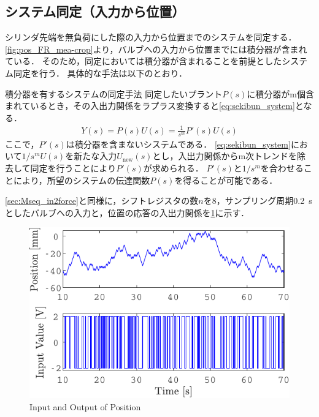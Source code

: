 \subsection{システム同定（入力から位置）}
シリンダ先端を無負荷にした際の入力から位置までのシステムを同定する．
\figname\ref{fig:pos_FR_mea-crop}より，バルブへの入力から位置までには積分器が含まれている．
そのため，同定においては積分器が含まれることを前提としたシステム同定\cite{竹下侑2014積分器を有するシステムの同定について}を行う．
具体的な手法は以下のとおり．
\begin{itembox}[l]{積分器を有するシステムの同定手法}
    同定したいプラント$P(s)$に積分器がm個含まれているとき，その入出力関係をラプラス変換すると\eqnname\ref{eq:sekibun_system}となる．
    \begin{align}
        \label{eq:sekibun_system}
        Y(s) = P(s)U(s) = \frac{1}{s^m}P'(s)U(s)
    \end{align}
    ここで，$P'(s)$は積分器を含まないシステムである．
    \eqnname\ref{eq:sekibun_system}において${1}/{s^m}U(s)$を新たな入力$U_{\mathrm{new}}(s)$とし，入出力関係からm次トレンドを除去して同定を行うことにより$P'(s)$が求められる．
    $P'(s)$と$1/s^m$を合わせることにより，所望のシステムの伝達関数$P(s)$を得ることが可能である．
\end{itembox}
\ref{sec:Mseq_in2force}と同様に，シフトレジスタの数$n$を8，サンプリング周期\SI{0.2}{s}としたバルブへの入力と，位置の応答の入出力関係を\figname\ref{fig:crop-inputANDpos}に示す．
\begin{figure}[t]
    \centering
        \includegraphics[keepaspectratio, scale=1.0]{contents/システム同定/figure/crop-inputANDpos.pdf}
        \caption{Input and Output of Position}
        \label{fig:crop-inputANDpos}
\end{figure}





































